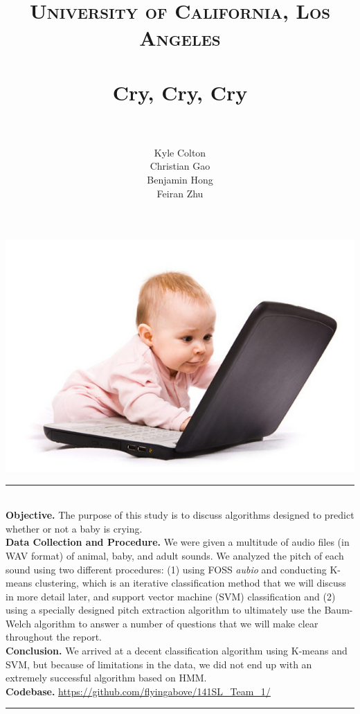 \documentclass[paper=a4, fontsize=11pt]{scrartcl}
\title{
		\usefont{OT1}{bch}{b}{n}
		\normalfont \normalsize \textsc{University of California, Los Angeles} \\ [25pt]
		\horrule{0.5pt} \\[0.4cm]
		\huge Cry, Cry, Cry \\
		\horrule{2pt} \\[0.5cm]
}
\author{
		\normalfont \normalsize Kyle Colton \\
        \normalfont \normalsize Christian Gao \\
        \normalfont \normalsize  Benjamin Hong \\
        \normalfont \normalsize Feiran Zhu\\
}
\date{}
\numberwithin{equation}{section}
\numberwithin{figure}{section}
\numberwithin{table}{section}
\newcommand{\horrule}[1]{\rule{\linewidth}{#1}}
\begin{document}
\maketitle

\includegraphics[width=\textwidth]{baby.jpg}
\newpage

\tableofcontents
\newpage
\noindent \horrule{0.5pt} 
{\textbf{\\ Objective.}}
The purpose of this study is to discuss algorithms designed to predict whether or not a baby is crying. 
{\textbf{\\ Data Collection and Procedure.}}
We were given a multitude of audio files (in WAV format) of animal, baby, and adult sounds. We analyzed the pitch of each sound using two different procedures: (1) using FOSS \textit{aubio} and conducting K-means clustering, which is an iterative classification method that we will discuss in more detail later, and support vector machine (SVM) classification and (2) using a specially designed pitch extraction algorithm to ultimately use the Baum-Welch algorithm to answer a number of questions that we will make clear throughout the report.
{\textbf{\\ Conclusion.}}
We arrived at a decent classification algorithm using K-means and SVM, but because of limitations in the data, we did not end up with an extremely successful algorithm based on HMM.  \\
\textbf{Codebase.}
\url{https://github.com/flyingabove/141SL_Team_1/}\\
\horrule{0.5pt} \\[0.4cm]
\end{document}
